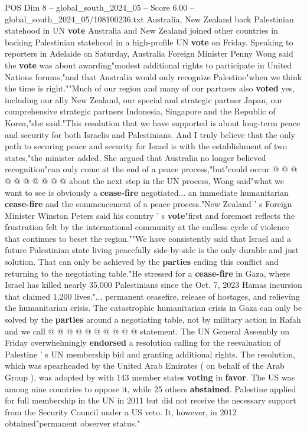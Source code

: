 \begin{textsample}{POS Dim 8 – global\_south\_2024\_05 – Score 6.00 – global\_south\_2024\_05/108100236.txt}  \label{ex:f8_pos_225}
Australia, New Zealand back Palestinian statehood in UN \textbf{vote} Australia and New Zealand joined other countries in backing Palestinian statehood in a high-profile UN \textbf{vote} on Friday.
Speaking to reporters in Adelaide on Saturday, Australia Foreign Minister Penny Wong said the \textbf{vote} was about awarding"modest additional rights to participate in United Nations forums,"and that Australia would only recognize Palestine"when we think the time is right.""Much of our region and many of our partners also \textbf{voted} yes, including our ally New Zealand, our special and strategic partner Japan, our comprehensive strategic partners Indonesia, Singapore and the Republic of Korea,"she said."This resolution that we have supported is about long-term peace and security for both Israelis and Palestinians.
And I truly believe that the only path to securing peace and security for Israel is with the establishment of two states,"the minister added.
She argued that Australia no longer believed recognition"can only come at the end of a peace process,"but"could occur @ @ @ @ @ @ @ @ @ @ about the next step in the UN process, Wong said"what we want to see is obviously a \textbf{cease-fire} negotiated... an immediate humanitarian \textbf{cease-fire} and the commencement of a peace process."New Zealand ' s Foreign Minister Winston Peters said his country ' s \textbf{vote}"first and foremost reflects the frustration felt by the international community at the endless cycle of violence that continues to beset the region.""We have consistently said that Israel and a future Palestinian state living peacefully side-by-side is the only durable and just solution.
That can only be achieved by the \textbf{parties} ending this conflict and returning to the negotiating table."He stressed for a \textbf{cease-fire} in Gaza, where Israel has killed nearly 35,000 Palestinians since the Oct. 7, 2023 Hamas incursion that claimed 1,200 lives."... permanent ceasefire, release of hostages, and relieving the humanitarian crisis.
The catastrophic humanitarian crisis in Gaza can only be solved by the \textbf{parties} around a negotiating table, not by military action in Rafah and we call @ @ @ @ @ @ @ @ @ @ statement.
The UN General Assembly on Friday overwhelmingly \textbf{endorsed} a resolution calling for the reevaluation of Palestine ' s UN membership bid and granting additional rights.
The resolution, which was spearheaded by the United Arab Emirates ( on behalf of the Arab Group ), was adopted by with 143 member states \textbf{voting} in \textbf{favor}.
The US was among nine countries to oppose it, while 25 others \textbf{abstained}.
Palestine applied for full membership in the UN in 2011 but did not receive the necessary support from the Security Council under a US veto.
It, however, in 2012 obtained"permanent observer status."

\end{textsample}
